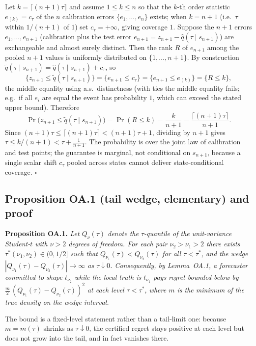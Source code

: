 \documentclass[11pt]{article}
\begin{document}
Let $k=\lceil(n{+}1)\tau\rceil$ and assume $1\le k\le n$ so that the
$k$-th order statistic $e_{(k)}=c_\tau$ of the $n$ calibration errors
$\{e_1,\dots,e_n\}$ exists; when $k=n+1$ (i.e.\ $\tau$ within $1/(n+1)$
of $1$) set $c_\tau=+\infty$, giving coverage $1$. Suppose the $n+1$
errors $e_1,\dots,e_{n+1}$ (calibration plus the test error
$e_{n+1}=z_{n+1}-\widehat q(\tau\mid s_{n+1})$) are exchangeable and
almost surely distinct. Then the rank $R$ of $e_{n+1}$ among the pooled
$n+1$ values is uniformly distributed on $\{1,\dots,n+1\}$. By
construction $\widetilde q(\tau\mid s_{n+1})=\widehat q(\tau\mid
s_{n+1})+c_\tau$, so
\[
\{z_{n+1}\le\widetilde q(\tau\mid s_{n+1})\}
=\{e_{n+1}\le c_\tau\}
=\{e_{n+1}\le e_{(k)}\}
=\{R\le k\},
\]
the middle equality using a.s.\ distinctness (with ties the middle
equality fails; e.g.\ if all $e_i$ are equal the event has probability
$1$, which can exceed the stated upper bound). Therefore
\[
\Pr\big(z_{n+1}\le\widetilde q(\tau\mid s_{n+1})\big)
=\Pr(R\le k)=\frac{k}{n+1}
=\frac{\lceil(n{+}1)\tau\rceil}{n+1}.
\]
Since $(n{+}1)\tau\le\lceil(n{+}1)\tau\rceil<(n{+}1)\tau+1$, dividing by
$n+1$ gives $\tau\le k/(n+1)<\tau+\tfrac1{n+1}$. The probability is over
the joint law of calibration and test points; the guarantee is
marginal, not conditional on $s_{n+1}$, because a single scalar shift
$c_\tau$ pooled across states cannot deliver state-conditional
coverage. \hfill$\square$

\subsection*{Proposition OA.1 (tail wedge, elementary) and proof}

\noindent\textbf{Proposition OA.1.} \emph{Let $Q_\nu(\tau)$ denote the $\tau$-quantile of the unit-variance
Student-$t$ with $\nu > 2$ degrees of freedom. For each pair
$\nu_2 > \nu_1 > 2$ there exists $\tau^*(\nu_1,\nu_2) \in (0, 1/2]$
such that $Q_{\nu_1}(\tau) < Q_{\nu_2}(\tau)$ for all $\tau < \tau^*$, and the wedge $|Q_{\nu_1}(\tau) - Q_{\nu_2}(\tau)| \to \infty$ as $\tau \downarrow 0$. Consequently, by Lemma~OA.1, a
forecaster committed to shape $t_{\nu_2}$ while the local truth is
$t_{\nu_1}$ pays regret bounded below by
$\tfrac{m}{2}\,(Q_{\nu_1}(\tau) - Q_{\nu_2}(\tau))^2$ at each level
$\tau < \tau^*$, where $m$ is the minimum of the true density on the
wedge interval.}

\noindent The bound is a fixed-level statement rather than a tail-limit one: because $m=m(\tau)$ shrinks as $\tau\downarrow0$, the certified regret stays positive at each level but does not grow into the tail, and in fact vanishes there.
\end{document}

